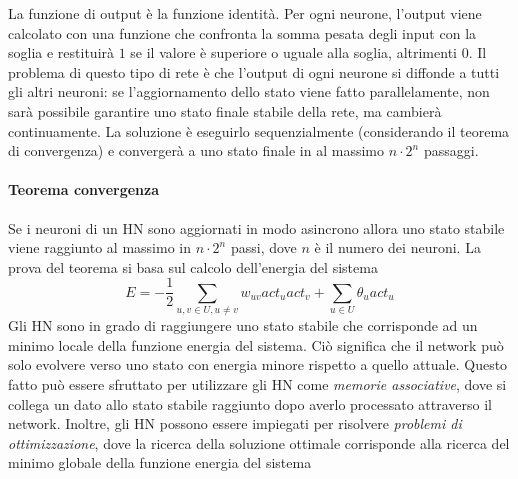 La funzione di output è la funzione identità. Per ogni neurone, l'output viene calcolato con una funzione che confronta la somma pesata degli input con la soglia e restituirà $1$ se il valore è superiore o uguale alla soglia, altrimenti $0$. Il problema di questo tipo di rete è che l'output di ogni neurone si diffonde a tutti gli altri neuroni: se l'aggiornamento dello stato viene fatto parallelamente, non sarà possibile garantire uno stato finale stabile della rete, ma cambierà continuamente. La soluzione è eseguirlo sequenzialmente (considerando il teorema di convergenza) e convergerà a uno stato finale in al massimo $n\cdot2^n$ passaggi.

\paragraph{Teorema convergenza}
Se i neuroni di un HN sono aggiornati in modo asincrono allora uno stato stabile viene raggiunto al massimo in $n\cdot 2^n$ passi, dove $n$ è il numero dei neuroni. La prova del teorema si basa sul calcolo dell'energia del sistema
$$E = -\frac{1}{2} \sum_{u,v \in U, u \neq v} w_{uv}act_u act_v + \sum_{u \in U} \theta_u act_u$$
Gli HN sono in grado di raggiungere uno stato stabile che corrisponde ad un minimo locale della funzione energia del sistema. Ciò significa che il network può solo evolvere verso uno stato con energia minore rispetto a quello attuale. Questo fatto può essere sfruttato per utilizzare gli HN come \textit{memorie associative}, dove si collega un dato allo stato stabile raggiunto dopo averlo processato attraverso il network. Inoltre, gli HN possono essere impiegati per risolvere \textit{problemi di ottimizzazione}, dove la ricerca della soluzione ottimale corrisponde alla ricerca del minimo globale della funzione energia del sistema

